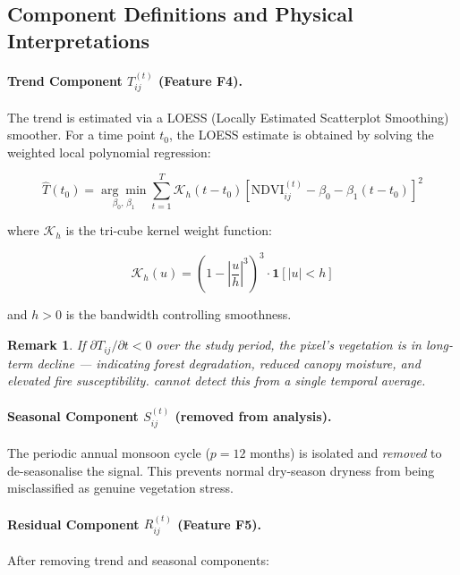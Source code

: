 \documentclass[12pt, a4paper]{article}
\newtheorem{remark}{Remark}[section]
\begin{document}
\subsection{Component Definitions and Physical Interpretations}

\paragraph{Trend Component $T_{ij}^{(t)}$ (Feature F4).}
The trend is estimated via a LOESS (Locally Estimated Scatterplot
Smoothing) smoother.
For a time point $t_0$, the LOESS estimate is obtained by solving the
weighted local polynomial regression:

\begin{equation}
  \hat{T}(t_0) =
  \underset{\beta_0,\,\beta_1}{\arg\min}
  \sum_{t=1}^{T}
  \mathcal{K}_h(t - t_0)
  \left[
    \mathrm{NDVI}_{ij}^{(t)} - \beta_0 - \beta_1(t - t_0)
  \right]^2
  \label{eq:loess}
\end{equation}

where $\mathcal{K}_h$ is the tri-cube kernel weight function:

\begin{equation}
  \mathcal{K}_h(u) =
  \left(1 - \left|\frac{u}{h}\right|^3\right)^3
  \cdot \mathbf{1}\!\left[|u| < h\right]
  \label{eq:tricube}
\end{equation}

and $h > 0$ is the bandwidth controlling smoothness.

\begin{remark}
If $\partial T_{ij} / \partial t < 0$ over the study period,
the pixel's vegetation is in long-term decline --- indicating
forest degradation, reduced canopy moisture, and elevated fire
susceptibility. \citeauthor{biswas2025} cannot detect this
from a single temporal average.
\end{remark}

\paragraph{Seasonal Component $S_{ij}^{(t)}$ (removed from analysis).}
The periodic annual monsoon cycle ($p = 12$ months) is isolated and
\emph{removed} to de-seasonalise the signal.
This prevents normal dry-season dryness from being misclassified as
genuine vegetation stress.

\paragraph{Residual Component $R_{ij}^{(t)}$ (Feature F5).}
After removing trend and seasonal components:
\end{document}
